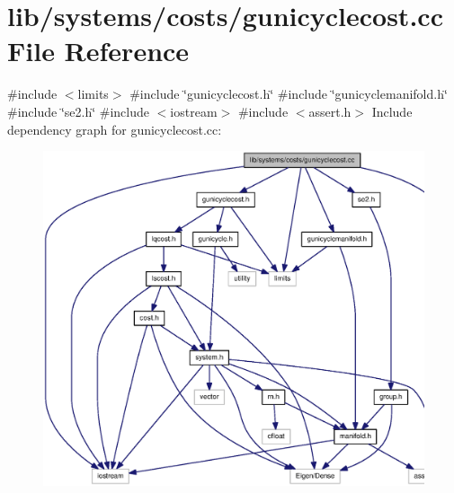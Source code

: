 \section{lib/systems/costs/gunicyclecost.cc \-File \-Reference}
\label{gunicyclecost_8cc}
{\ttfamily \#include $<$limits$>$}\*
{\ttfamily \#include \char`\"{}gunicyclecost.\-h\char`\"{}}\*
{\ttfamily \#include \char`\"{}gunicyclemanifold.\-h\char`\"{}}\*
{\ttfamily \#include \char`\"{}se2.\-h\char`\"{}}\*
{\ttfamily \#include $<$iostream$>$}\*
{\ttfamily \#include $<$assert.\-h$>$}\*
\-Include dependency graph for gunicyclecost.\-cc\-:
\nopagebreak
\begin{figure}[H]
\begin{center}
\leavevmode
\includegraphics[width=350pt]{gunicyclecost_8cc__incl}
\end{center}
\end{figure}
